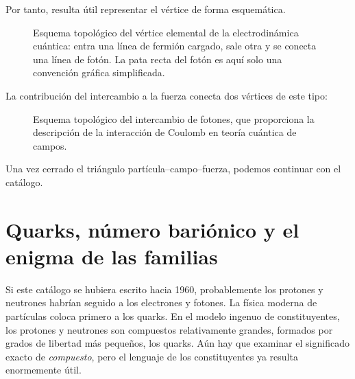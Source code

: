 Por tanto, resulta útil representar el vértice de forma esquemática.

\begin{figure}[h]
\centering
{}
\caption{Esquema topológico del vértice elemental de la electrodinámica cuántica: entra una línea de fermión cargado, sale otra y se conecta una línea de fotón. La pata recta del fotón es aquí solo una convención gráfica simplificada.}
\end{figure}

La contribución del intercambio a la fuerza conecta dos vértices de este tipo:

\begin{figure}[h]
\centering
{}
\caption{Esquema topológico del intercambio de fotones, que proporciona la descripción de la interacción de Coulomb en teoría cuántica de campos.}
\end{figure}

Una vez cerrado el triángulo partícula--campo--fuerza, podemos continuar con el catálogo.

\section{Quarks, número bariónico y el enigma de las familias}

Si este catálogo se hubiera escrito hacia 1960, probablemente los protones y neutrones habrían seguido a los electrones y fotones. La física moderna de partículas coloca primero a los quarks. En el modelo ingenuo de constituyentes, los protones y neutrones son compuestos relativamente grandes, formados por grados de libertad más pequeños, los quarks. Aún hay que examinar el significado exacto de \emph{compuesto}, pero el lenguaje de los constituyentes ya resulta enormemente útil.

